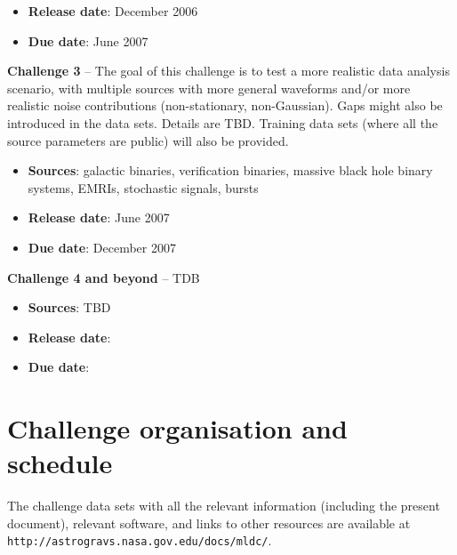 \documentclass[11pt]{report}
\begin{document}
\begin{description}
\begin{itemize}
\item {\bf Release date}: December 2006

\item {\bf Due date}: June 2007

\end{itemize}

\item{{\bf Challenge 3}} -- The goal of this challenge is to test a more realistic data analysis scenario, with multiple sources with more general waveforms and/or more realistic noise contributions (non-stationary, non-Gaussian). Gaps might also be introduced in the data sets. Details are TBD. Training data sets (where all the source parameters are public) will also be provided. 

\begin{itemize}

\item {\bf Sources}: galactic binaries, verification binaries, massive black hole binary systems, EMRIs, stochastic signals, bursts


\item {\bf Release date}: June 2007

\item {\bf Due date}: December 2007

\end{itemize}

\item{{\bf Challenge 4 and beyond}} -- TDB

\begin{itemize}

\item {\bf Sources}: TBD

\item {\bf Release date}:

\item {\bf Due date}:

\end{itemize}

\end{description}

\section{Challenge organisation and schedule}

The challenge data sets with all the relevant information (including the present document), relevant software, and links to other resources are available at {\tt http://astrogravs.nasa.gov.edu/docs/mldc/}.
\end{document}
